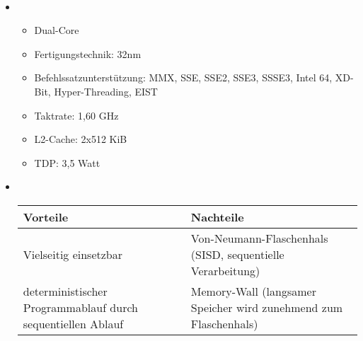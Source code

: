 \documentclass{mywork}
\begin{document}
\setcounter{aufgabe}{3}

\begin{aufgabe}~

	\begin{itemize}
		\item
			\begin{itemize}
				\item
					Dual-Core
				\item
					Fertigungstechnik: 32nm
				\item
					Befehlssatzunterstützung: MMX, SSE, SSE2, SSE3, SSSE3, Intel 64, XD-Bit, Hyper-Threading, EIST
				\item
					Taktrate: 1,60 GHz
				\item
					L2-Cache: 2x512 KiB
				\item
					TDP: 3,5 Watt
			\end{itemize}
		\item ~
			\begin{table}[h]
				\centering
				\begin{tabular}{p{8cm}|p{8cm}}
					Vorteile & Nachteile \\ \hline
					Vielseitig einsetzbar & Von-Neumann-Flaschenhals (SISD, sequentielle Verarbeitung) \\
					deterministischer Programmablauf durch sequentiellen Ablauf & Memory-Wall (langsamer Speicher wird zunehmend zum Flaschenhals)


\end{tabular}
\end{table}
\end{itemize}
\end{aufgabe}
\end{document}
